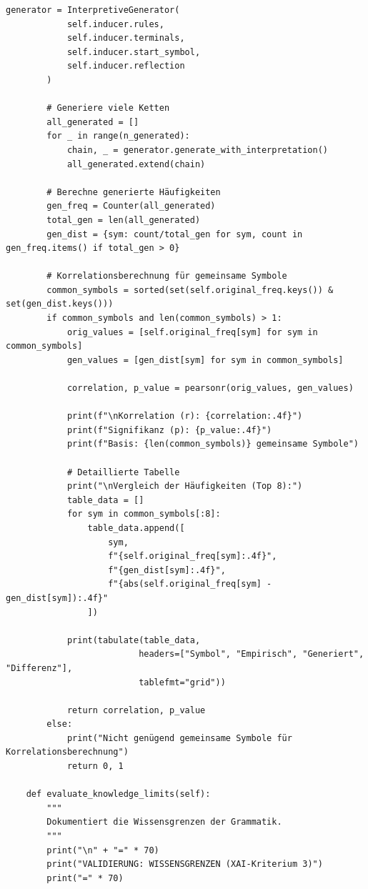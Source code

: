 \documentclass[
  12pt,
  a4paper,
  oneside,
  titlepage
]{article}
\begin{document}
\begin{lstlisting}[caption=Algorithmisch Rekursive Sequenzanalyse 3.0 - Hierarchische Grammatikinduktion]
        generator = InterpretiveGenerator(
            self.inducer.rules, 
            self.inducer.terminals, 
            self.inducer.start_symbol,
            self.inducer.reflection
        )
        
        # Generiere viele Ketten
        all_generated = []
        for _ in range(n_generated):
            chain, _ = generator.generate_with_interpretation()
            all_generated.extend(chain)
        
        # Berechne generierte Häufigkeiten
        gen_freq = Counter(all_generated)
        total_gen = len(all_generated)
        gen_dist = {sym: count/total_gen for sym, count in gen_freq.items() if total_gen > 0}
        
        # Korrelationsberechnung für gemeinsame Symbole
        common_symbols = sorted(set(self.original_freq.keys()) & set(gen_dist.keys()))
        if common_symbols and len(common_symbols) > 1:
            orig_values = [self.original_freq[sym] for sym in common_symbols]
            gen_values = [gen_dist[sym] for sym in common_symbols]
            
            correlation, p_value = pearsonr(orig_values, gen_values)
            
            print(f"\nKorrelation (r): {correlation:.4f}")
            print(f"Signifikanz (p): {p_value:.4f}")
            print(f"Basis: {len(common_symbols)} gemeinsame Symbole")
            
            # Detaillierte Tabelle
            print("\nVergleich der Häufigkeiten (Top 8):")
            table_data = []
            for sym in common_symbols[:8]:
                table_data.append([
                    sym,
                    f"{self.original_freq[sym]:.4f}",
                    f"{gen_dist[sym]:.4f}",
                    f"{abs(self.original_freq[sym] - gen_dist[sym]):.4f}"
                ])
            
            print(tabulate(table_data, 
                          headers=["Symbol", "Empirisch", "Generiert", "Differenz"],
                          tablefmt="grid"))
            
            return correlation, p_value
        else:
            print("Nicht genügend gemeinsame Symbole für Korrelationsberechnung")
            return 0, 1
    
    def evaluate_knowledge_limits(self):
        """
        Dokumentiert die Wissensgrenzen der Grammatik.
        """
        print("\n" + "=" * 70)
        print("VALIDIERUNG: WISSENSGRENZEN (XAI-Kriterium 3)")
        print("=" * 70)
        

\end{lstlisting}
\end{document}
